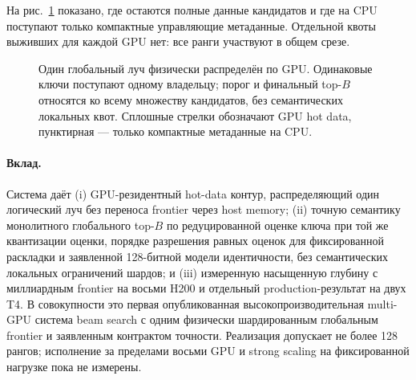 \documentclass[10pt,twocolumn]{article}
\newcommand{\frontier}{\mathcal{F}}
\begin{document}
На рис.~\ref{fig:global_beam} показано, где остаются полные данные кандидатов
и где на CPU поступают только компактные управляющие метаданные. Отдельной
квоты выживших для каждой GPU нет: все ранги участвуют в общем срезе.

\begin{figure}[t]
\centering
{}
\caption{Один глобальный луч физически распределён по GPU. Одинаковые ключи
поступают одному владельцу; порог и финальный top-$B$ относятся ко всему
множеству кандидатов, без семантических локальных квот. Сплошные стрелки
обозначают GPU hot data, пунктирная --- только компактные метаданные на CPU.}
\label{fig:global_beam}
\end{figure}

\paragraph{Вклад.}
Система даёт (i) GPU-резидентный hot-data контур, распределяющий один логический
луч без переноса frontier через host memory; (ii) точную семантику монолитного
глобального top-$B$ по редуцированной оценке ключа при той же квантизации
оценки, порядке разрешения равных оценок для фиксированной раскладки и
заявленной 128-битной модели идентичности, без семантических локальных
ограничений шардов; и (iii) измеренную насыщенную глубину с миллиардным
frontier на восьми H200 и отдельный production-результат на двух T4.
В совокупности это первая опубликованная
высокопроизводительная multi-GPU система beam search с одним физически
шардированным глобальным frontier и заявленным контрактом точности. Реализация
допускает не более 128 рангов; исполнение за пределами восьми GPU и strong
scaling на фиксированной нагрузке пока не измерены.
\end{document}
